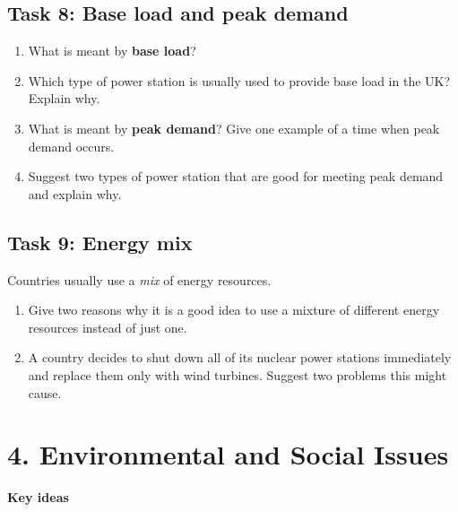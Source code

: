 \documentclass[11pt,a4paper]{article}
\begin{document}
\subsection*{Task 8: Base load and peak demand}

\begin{enumerate}[label=\arabic*)]
    \item What is meant by \textbf{base load}?
    \vspace{2cm}

    \item Which type of power station is usually used to provide base load in the UK? Explain why.
    \vspace{2.5cm}

    \item What is meant by \textbf{peak demand}? Give one example of a time when peak demand occurs.
    \vspace{2.5cm}

    \item Suggest two types of power station that are good for meeting peak demand and explain why.
    \vspace{3cm}
\end{enumerate}
\newpage
\subsection*{Task 9: Energy mix}

Countries usually use a \emph{mix} of energy resources.

\begin{enumerate}[label=\arabic*)]
    \item Give two reasons why it is a good idea to use a mixture of different energy resources instead of just one.
    \vspace{2.5cm}

    \item A country decides to shut down all of its nuclear power stations immediately and replace them only with wind turbines. Suggest two problems this might cause.
    \vspace{3cm}
\end{enumerate}

\newpage

\section*{4. Environmental and Social Issues}

\textbf{Key ideas}
\end{document}
